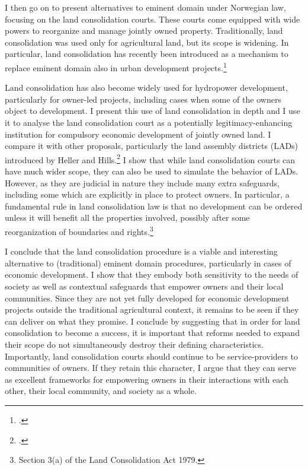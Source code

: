 \documentclass[12pt,a4paper]{article} %
\begin{document}
I then go on to present alternatives to eminent domain under Norwegian law, focusing on the land consolidation courts. These courts come equipped with wide powers to reorganize and manage jointly owned property. Traditionally, land consolidation was used only for agricultural land, but its scope is widening. In particular, land consolidation has recently been introduced as a mechanism to replace eminent domain also in urban development projects.\footcite[788-790]{stenseth10}

Land consolidation has also become widely used for hydropower development, particularly for owner-led projects, including cases when some of the owners object to development. I present this use of land consolidation in depth and I use it to analyse the land consolidation court as a potentially legitimacy-enhancing institution for compulsory economic development of jointly owned land. I compare it with other proposals, particularly the land assembly districts (LADs) introduced by Heller and Hills.\footcite{heller08} I show that while land consolidation courts can have much wider scope, they can also be used to simulate the behavior of LADs. However, as they are judicial in nature they include many extra safeguards, including some which are explicitly in place to protect owners. In particular, a fundamental rule in land consolidation law is that no development can be ordered unless it will benefit all the properties involved, possibly after some reorganization of boundaries and rights.\footnote{Section 3(a) of the Land Consolidation Act 1979.}

I conclude that the land consolidation procedure is a viable and interesting alternative to (traditional) eminent domain procedures, particularly in cases of economic development. I show that they embody both sensitivity to the needs of society as well as  contextual safeguards that empower owners and their local communities. Since they are not yet fully developed for economic development projects outside the traditional agricultural context, it remains to be seen if they can deliver on what they promise. I conclude by suggesting that in order for land consolidation to become a success, it is important that reforms needed to expand their scope do not simultaneously destroy their defining characteristics. Importantly, land consolidation courts should continue to be service-providers to communities of owners. If they retain this character, I argue that they can serve as excellent frameworks for empowering owners in their interactions with each other, their local community, and society as a whole. \\
\end{document}
